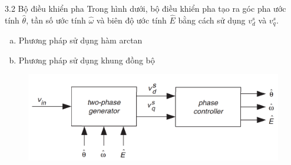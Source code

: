 \documentclass[11pt]{beamer}
\renewcommand{\label}[1]{%
			\gdef\sfname{sf:##1}}%
\newcommand{\reusefigure}[2][htbp]{%
	{\addtocounter{figure}{-1}%
		\renewcommand{\theHfigure}{dupe-fig}%
		\renewcommand{\thefigure}{\ref{#2}}%
		\renewcommand{\addcontentsline}[3]{}%
		\renewcommand{\label}[1]{}%
		\begin{figure}[#1] \csname sf:#2\endcsname \end{figure}}
}
\begin{document}
	\begin{frame}[t]{3.2 Bộ điều khiển pha}
		Trong hình dưới, bộ điều khiển pha tạo ra góc pha ước tính  $\hat{\theta}$, tần số ước tính $\hat{\omega}$ và biên độ ước tính $\hat{E}$ bằng cách sử dụng $v_d^s$ và $v_q^s$.		

		\begin{enumerate}[(a)]
			\item Phương pháp sử dụng hàm arctan
			\item Phương pháp sử dụng khung đồng bộ
		\end{enumerate}
		\begin{figure}[h]	
		\includegraphics[width=1\textwidth]{Fig. 3 Virtual two-phase detector.PNG}
		
		\label{fig:Virtual two-phase detector}
		\end{figure}
	\end{frame}
\end{document}
